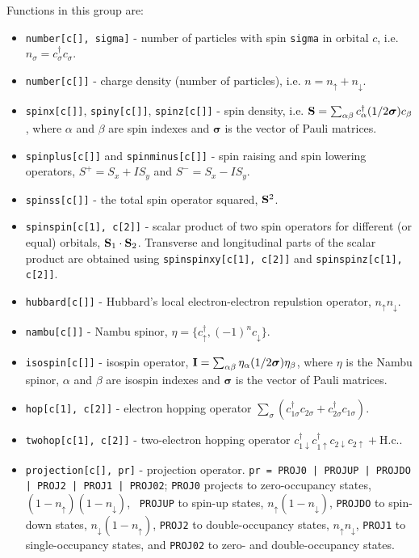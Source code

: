 \documentclass[a4paper,10pt,openany]{book}
\begin{document}
Functions in this group are:
%
\begin{itemize}
\item {\tt number[c[], sigma]} - number of particles with spin {\tt sigma}
in orbital $c$, i.e. $n_\sigma=c^\dag_\sigma c_\sigma$.

\item {\tt number[c[]]} - charge density (number of particles),
i.e. $n=n_\uparrow + n_\downarrow$.

\item {\tt spinx[c[]]}, {\tt spiny[c[]]}, {\tt spinz[c[]]} - spin density,
i.e. $\mathbf{S} = \sum_{\alpha\beta} c^\dag_\alpha (1/2 \boldsymbol{\sigma})
c_\beta$, where $\alpha$ and $\beta$ are spin indexes and
$\boldsymbol{\sigma}$ is the vector of Pauli matrices.

\item {\tt spinplus[c[]]} and {\tt spinminus[c[]]} - spin raising and
spin lowering operators, $S^+=S_x+I S_y$ and $S^-=S_x-I S_y$.

\item {\tt spinss[c[]]} - the total spin operator squared, $\mathbf{S}^2$.

\item {\tt spinspin[c[1], c[2]]} - scalar product of two spin operators
for different (or equal) orbitals, $\mathbf{S}_1 \cdot \mathbf{S}_2$.
Transverse and longitudinal parts of the scalar product are obtained
using {\tt spinspinxy[c[1], c[2]]} and {\tt spinspinz[c[1], c[2]]}.

\item {\tt hubbard[c[]]} - Hubbard's local electron-electron repulstion
operator, $n_\uparrow n_\downarrow$.

\item {\tt nambu[c[]]} - Nambu spinor, $\eta = \{ c^\dag_\uparrow, (-1)^n
c_\downarrow \}$.

\item {\tt isospin[c[]]} - isospin operator, $\mathbf{I} = \sum_{\alpha\beta}
\eta_\alpha (1/2 \boldsymbol{\sigma}) \eta_\beta$, where $\eta$ is the Nambu
spinor, $\alpha$ and $\beta$ are isospin indexes and $\boldsymbol{\sigma}$
is the vector of Pauli matrices.

\item {\tt hop[c[1], c[2]]} - electron hopping operator
$\sum_\sigma (c^\dag_{1\sigma} c_{2\sigma} + c^\dag_{2\sigma} c_{1\sigma})$.

\item {\tt twohop[c[1], c[2]]} - two-electron hopping operator
$c^\dag_{1\downarrow} c^\dag_{1\uparrow} c_{2\downarrow} c_{2\uparrow}
+\text{H.c.}$.

\item {\tt projection[c[], pr]} - projection operator.
{\tt pr = PROJ0 | PROJUP | PROJDO | PROJ2 | PROJ1 | PROJ02}; {\tt PROJ0}
projects to zero-occupancy states, $(1-n_\uparrow)(1-n_\downarrow)$, {\tt
PROJUP} to spin-up states, $n_\uparrow(1-n_\downarrow)$, {\tt PROJDO} to
spin-down states, $n_\downarrow(1-n_\uparrow)$, {\tt PROJ2} to
double-occupancy states, $n_\uparrow n_\downarrow$, {\tt PROJ1} to
single-occupancy states, and {\tt PROJ02} to zero- and double-occupancy
states.

\end{itemize}
\end{document}
